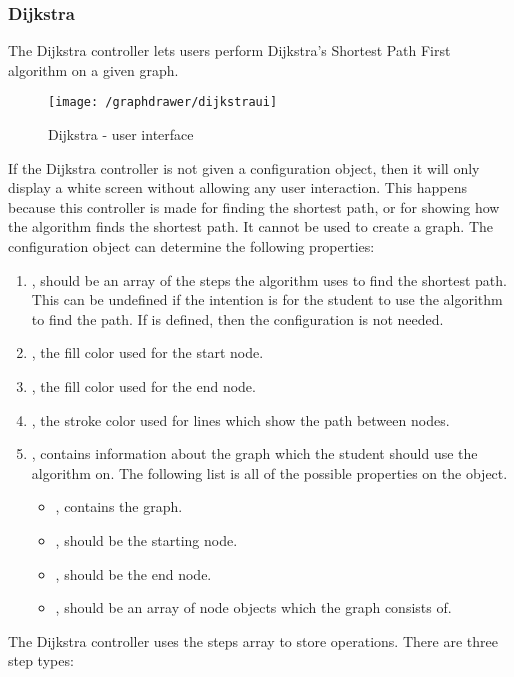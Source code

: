 \subsubsection{Dijkstra}
The Dijkstra controller lets users perform Dijkstra's Shortest Path First algorithm on a given graph.
\begin{figure}[H]
    \centering
    \texttt{[image: /graphdrawer/dijkstraui]}
    \caption{Dijkstra - user interface}
    \label{fig:graphdrawerDijkstraUserInterface}
\end{figure}
\noindent
If the Dijkstra controller is not given a configuration object, then it will only display a white screen without allowing any user interaction. This happens because this controller is made for finding the shortest path, or for showing how the algorithm finds the shortest path. It cannot be used to create a graph. The configuration object can determine the following properties:
\begin{enumerate}
    \item {}, should be an array of the steps the algorithm uses to find the shortest path. This can be undefined if the intention is for the student to use the algorithm to find the path. If  is defined, then the  configuration is not needed.
    \item {}, the fill color used for the start node.
    \item {}, the fill color used for the end node.
    \item {}, the stroke color used for lines which show the path between nodes.
    \item {}, contains information about the graph which the student should use the algorithm on. The following list is all of the possible properties on the  object.
    \begin{itemize}
        \item {}, contains the graph.
        \item {}, should be the starting node.
        \item {}, should be the end node.
        \item {}, should be an array of node objects which the graph consists of.
    \end{itemize}
\end{enumerate}
The Dijkstra controller uses the steps array to store operations. There are three step types:
